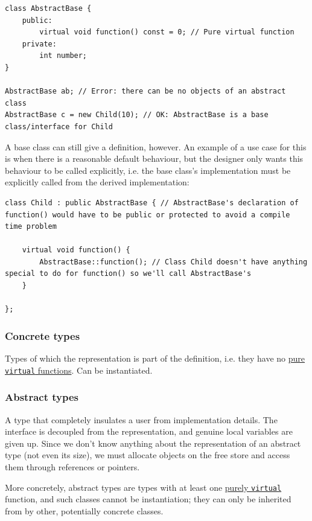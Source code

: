 \documentclass[table, xcdraw]{article}%
\begin{document}
\begin{verbatim}
class AbstractBase {
    public:
        virtual void function() const = 0; // Pure virtual function
    private:
        int number;
}

AbstractBase ab; // Error: there can be no objects of an abstract class
AbstractBase c = new Child(10); // OK: AbstractBase is a base class/interface for Child
\end{verbatim}

A base class can still give a definition, however. An example of a use case for this is when there is a reasonable default behaviour, but the designer only wants this behaviour to be called explicitly, i.e. the base class's implementation must be explicitly called from the derived implementation:

\begin{verbatim}
class Child : public AbstractBase { // AbstractBase's declaration of function() would have to be public or protected to avoid a compile time problem

    virtual void function() {
        AbstractBase::function(); // Class Child doesn't have anything special to do for function() so we'll call AbstractBase's
    }

};
\end{verbatim}

\subsubsection{Concrete types}
Types of which the representation is part of the definition, i.e. they have no \hyperref[purevirtual]{pure \texttt{virtual} functions}. Can be instantiated.

\subsubsection{Abstract types}
A type that completely insulates a user from implementation details. The interface is decoupled from the representation, and genuine local variables are given up. Since we don't know anything about the representation of an abstract type (not even its size), we must allocate objects on the free store and access them through references or pointers.

More concretely, abstract types are types with at least one \hyperref[purevirtual]{purely \texttt{virtual}} function, and such classes cannot be instantiation; they can only be inherited from by other, potentially concrete classes.
\end{document}
